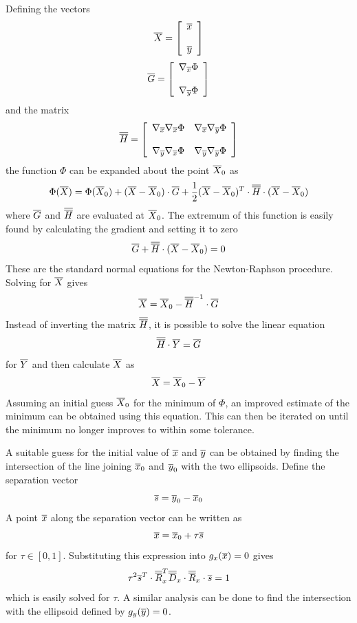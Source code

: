 \documentclass[12pt]{article}
\begin{document}
Defining the vectors
\[
\overline{X} = \left[\begin{array}{c}\overline{x}\\ \\ \overline{y}\end{array}\right]
\]
\[
\overline{G} = \left[\begin{array}{c}\nabla_{\overline{x}}\Phi\\ \\ \nabla_{\overline{y}}\Phi\end{array}\right]
\]
and the matrix
\[
\overline{\overline{H}} = \left[\begin{array}{cc}\nabla_{\overline{x}}\nabla_{\overline{x}}\Phi &
\nabla_{\overline{x}}\nabla_{\overline{y}}\Phi \\ & \\
\nabla_{\overline{y}}\nabla_{\overline{x}}\Phi & \nabla_{\overline{y}}\nabla_{\overline{y}}\Phi \end{array}\right]
\]
the function $\Phi$ can be expanded about the point $\overline{X}_0$ as
\[
\Phi(\overline{X}) = \Phi(\overline{X}_0)+(\overline{X}-\overline{X}_0)\cdot\overline{G}+\frac{1}{2}(\overline{X}-\overline{X}_0)^T\cdot\overline{\overline{H}}\cdot(\overline{X}-\overline{X}_0)
\]
where $\overline{G}$ and $\overline{\overline{H}}$ are evaluated at $\overline{X}_0$. The extremum of this function is easily found by
calculating the gradient and setting it to zero
\[
\overline{G}+\overline{\overline{H}}\cdot(\overline{X}-\overline{X}_0) = 0
\]
These are the standard normal equations for the Newton-Raphson procedure. Solving for $\overline{X}$ gives
\[
\overline{X} = \overline{X}_0 - \overline{\overline{H}}^{-1}\cdot\overline{G}
\]
Instead of inverting the matrix $\overline{\overline{H}}$, it is possible to solve the linear equation
\[
\overline{\overline{H}}\cdot\overline{Y} = \overline{G}
\]
for $\overline{Y}$ and then calculate $\overline{X}$ as
\[
\overline{X} = \overline{X}_0 - \overline{Y}
\]
Assuming an initial guess $\overline{X}_0$ for the minimum of $\Phi$, an improved estimate of the minimum can be
obtained using this equation. This can then be iterated on until the minimum no longer improves to within
some tolerance.

A suitable guess for the initial value of $\overline{x}$ and $\overline{y}$ can be obtained by finding the intersection of
the line joining $\overline{x}_0$ and $\overline{y}_0$ with the two ellipsoids. Define the separation vector
\[
\overline{s} = \overline{y}_0-\overline{x}_0
\]
A point $\overline{x}$ along the separation vector can be written as
\[
\overline{x} = \overline{x}_0 + \tau\overline{s}
\]
for $\tau\in[0,1]$. Substituting this expression into $g_x(\overline{x})=0$ gives
\[
\tau^2\overline{s}^T\cdot\overline{\overline{R}}_x^T\overline{\overline{D}}_x\cdot\overline{\overline{R}}_x\cdot\overline{s} = 1
\]
which is easily solved for $\tau$. A similar analysis can be done to find the intersection with the ellipsoid
defined by $g_y(\overline{y})=0$.
\end{document}
